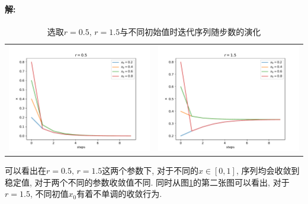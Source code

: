 \documentclass[a4paper,zihao=5,UTF8]{ctexart}
\begin{document}
    \paragraph{解: }
    \begin{table}[htbp]
        \begin{tabular}[htbp]{cc}
            \includegraphics[scale=0.5]{1_0.pdf} & \includegraphics[scale=0.5]{1_1.pdf}
        \end{tabular}
        \centering
        \caption{选取$r = 0.5,\,r = 1.5$与不同初始值时迭代序列随步数的演化}
        \label{problem 1}
    \end{table}
    \par 
    可以看出在$r=0.5,\,r=1.5$这两个参数下, 对于不同的$x\in[0, 1]$, 序列均会收敛到稳定值, 
    对于两个不同的参数收敛值不同. 同时从图\ref{problem 1}的第二张图可以看出, 
    对于$r=1.5$, 不同初值$x_0$有着不单调的收敛行为. 
\end{document}
